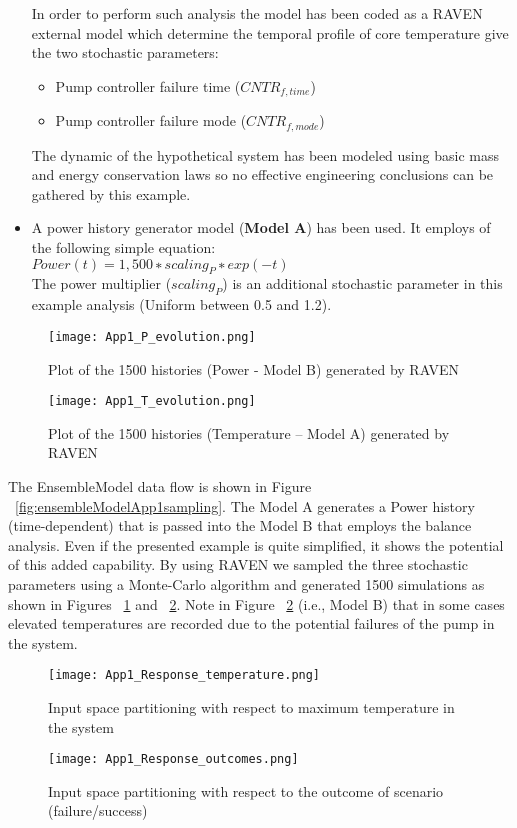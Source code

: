 \begin{itemize}
          In order to perform such analysis the model has been coded as a RAVEN external model
          which determine the temporal profile of core temperature give the two stochastic parameters:
          \begin{itemize}   
            \item Pump controller failure time ($CNTR_{f,time}$)
            \item Pump controller failure mode ($CNTR_{f,mode}$)
          \end{itemize} 
          The dynamic of the hypothetical system has been modeled using basic mass and energy
          conservation laws so no effective engineering conclusions can be gathered by this example.
   \item A power history generator model (\textbf{Model A}) has been used. It employs of the following simple
           equation:    
           \\$𝑃𝑜𝑤𝑒𝑟(𝑡) = 1,500 ∗ 𝑠𝑐𝑎𝑙𝑖𝑛𝑔_{𝑃} ∗ exp(−𝑡)$  
           \\The power multiplier ($scaling_{P}$) is an additional stochastic parameter in this example analysis (Uniform between 0.5 and 1.2).
\end{itemize}
\begin{figure}
    \centering
    \texttt{[image: App1\_P\_evolution.png]}
    \caption{Plot of the 1500 histories (Power - Model B) generated by RAVEN}
    \label{fig:ensembleModelApp1Power}
\end{figure}
\begin{figure}
    \centering
    \texttt{[image: App1\_T\_evolution.png]}
    \caption{Plot of the 1500 histories (Temperature – Model A) generated by RAVEN}
    \label{fig:ensembleModelApp1Temperature}
\end{figure}
The EnsembleModel data flow is shown in Figure ~\ref{fig:ensembleModelApp1sampling}. The Model A generates a Power history (time-dependent) that is passed into the Model B that employs the 
balance analysis. Even if the presented example is quite simplified, it shows the potential of this added capability.
By using RAVEN we sampled the three stochastic parameters using a Monte-Carlo algorithm and generated 1500 simulations as shown in Figures ~\ref{fig:ensembleModelApp1Power} and ~\ref{fig:ensembleModelApp1Temperature}. Note in Figure  ~\ref{fig:ensembleModelApp1Temperature} (i.e., Model B) that in some cases elevated temperatures are recorded due to the potential failures of the pump in the system.
\begin{figure}
    \centering
    \texttt{[image: App1\_Response\_temperature.png]}
    \caption{Input space partitioning with respect to maximum temperature in the system}
    \label{fig:ensembleModelApp1RespTemp}
\end{figure}
\begin{figure}
    \centering
    \texttt{[image: App1\_Response\_outcomes.png]}
    \caption{Input space partitioning with respect to the outcome of scenario (failure/success)}
    \label{fig:ensembleModelApp1RespOutcome}
\end{figure}

